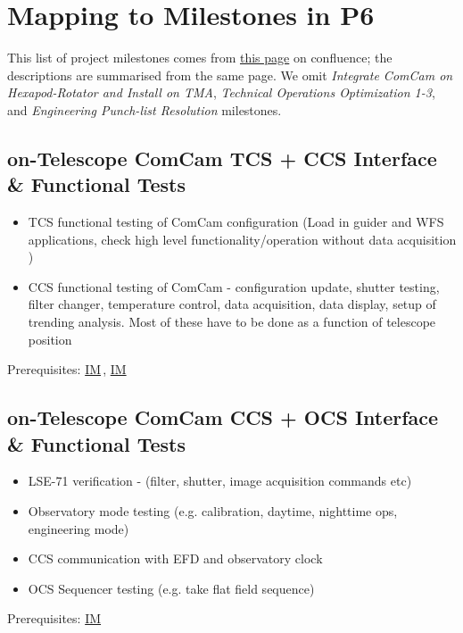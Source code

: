 \documentclass[SE,authoryear,toc]{lsstdoc}
\newcommand{\IM}[1]{\hyperref[IM:#1]{\color{blue}IM$_{\text{\csname nameIM#1\endcsname}}$}\gdef\thisIM{#1}}
\begin{document}
\appendix

\section{Mapping to Milestones in P6}
\label{sec:P6Milestones}

This list of project milestones comes from
\href{https://confluence.lsstcorp.org/pages/viewpage.action?pageId=62263966}{this page}
on confluence; the descriptions are summarised from the same page.  We omit
\textit{Integrate ComCam on Hexapod-Rotator and Install on TMA},
\textit{Technical Operations Optimization 1-3},
and
\textit{Engineering Punch-list Resolution} milestones.

\subsection{on-Telescope ComCam TCS + CCS Interface \& Functional Tests}

\begin{itemize}
\item
  TCS functional testing of ComCam configuration (Load in guider and WFS applications, check high level functionality/operation without data acquisition )
\item
  CCS functional testing of ComCam - configuration update, shutter testing, filter changer, temperature control, data acquisition, data display, setup of trending analysis. Most of these have to be done as a function of telescope position
\end{itemize}
Prerequisites: \IM{b}, \IM{g}

\subsection{on-Telescope ComCam CCS + OCS Interface \& Functional Tests}

\begin{itemize}
\item LSE-71 verification - (filter, shutter, image acquisition commands etc)
\item Observatory mode testing (e.g. calibration, daytime, nighttime ops, engineering mode)
\item CCS communication with EFD and observatory clock
\item OCS Sequencer testing (e.g. take flat field sequence)
\end{itemize}
Prerequisites: \IM{b}
\end{document}
